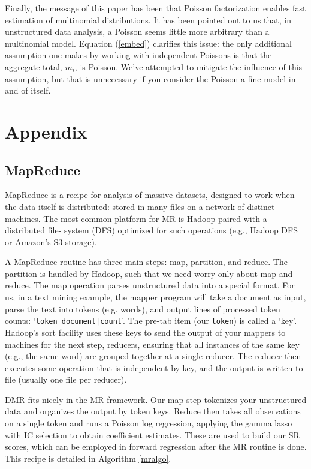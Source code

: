 \documentclass[12pt]{article}
\newcommand{\cd}[1]{{\tt#1}}
\begin{document}
Finally, the message of this paper has been that Poisson factorization
enables fast estimation of multinomial distributions.  It has been pointed out
to us that, in unstructured data analysis, a Poisson seems little more
arbitrary than a multinomial model.  Equation (\ref{embed}) clarifies this
issue:  the only additional assumption one makes by working with independent
Poissons is that the aggregate total, $m_i$, is Poisson.  We've attempted to
mitigate the influence of this assumption, but that is unnecessary if you
consider the Poisson a fine model in and of itself.

\appendix
\section{Appendix}

\subsection{MapReduce} 
\label{MR}

  MapReduce \citep[MR;][]{dean_mapreduce:_2004} is a  recipe
for analysis of massive datasets, designed to work when the data itself is
distributed: stored in many files on a network of distinct machines.
The most common platform for  MR is Hadoop paired with a distributed file-
system (DFS)  optimized for such operations (e.g., Hadoop DFS or
Amazon's S3 storage).

A MapReduce routine has three main steps: map, partition, and reduce.  The
partition  is handled by Hadoop, such that we need worry only
about map and reduce.  The map operation parses  unstructured data into a
special format.  For us, in a text mining example, the mapper program will
take a document as input, parse the text into tokens (e.g. words), and output
lines of processed token counts: `\cd{token   document|count}'.  The pre-tab
item (our \cd{token}) is called a `key'.  Hadoop's sort facility uses these
keys to send the output of your mappers to machines for the next step,
reducers, ensuring that all instances of the same key (e.g., the same word)
are grouped together at a single reducer.  The reducer then executes some
operation that is independent-by-key, and the output is written to file
(usually one file per reducer).

DMR fits nicely in the MR framework.  Our map step tokenizes your unstructured data  and organizes the output by token keys.  Reduce then takes all observations on a single token and runs a Poisson log regression, applying the gamma lasso with IC selection to obtain coefficient estimates.  These are used to build our SR scores, which can be employed in forward regression after the MR routine is done.  This recipe is detailed in Algorithm \ref{mralgo}.
\end{document}
